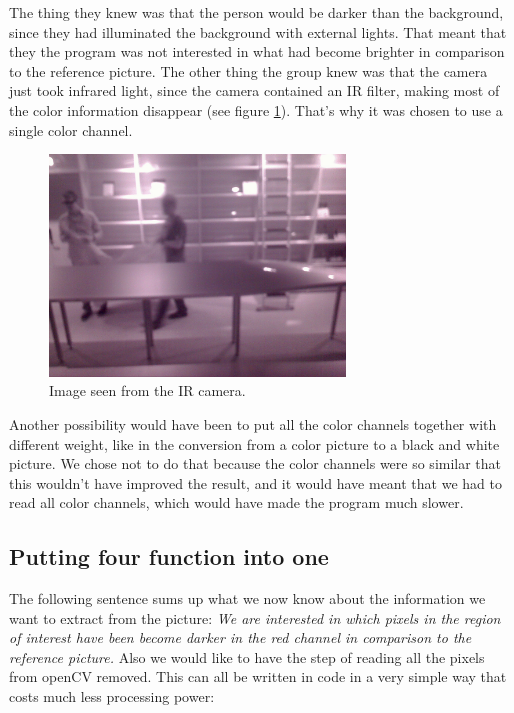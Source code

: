 The thing they knew was that the person would be darker than the background, since they had illuminated the background with external lights. That meant that they the program was not interested in what had become brighter in comparison to the reference picture. The other thing the group knew was that the camera just took infrared light, since the camera contained an IR filter, making most of the color information disappear (see figure \ref{fig:ir_max}). That's why it was chosen to use a single color channel.

\begin{figure}[htbp]
\centering
\includegraphics[width=0.7\textwidth]{Pictures/Design/ir_max}
\caption{Image seen from the IR camera.}
\label{fig:ir_max}
\end{figure}

Another possibility would have been to put all the color channels together with different weight, like in the conversion from a color picture to a black and white picture. We chose not to do that because the color channels were so similar that this wouldn't have improved the result, and it would have meant that we had to read all color channels, which would have made the program much slower. 

\subsection{Putting four function into one}\label{forInOne}
The following sentence sums up what we now  know about the information we want to extract from the picture: \textit{We are interested in which pixels in the region of interest have been become darker in the red channel in comparison to the reference picture.} 
Also we would like to have the step of reading all the pixels from openCV removed. This can all be written in code in a very simple way that costs much less processing power:

